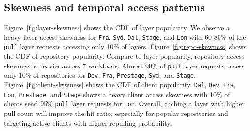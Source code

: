 %

\subsection{Skewness and temporal access patterns}



Figure~\ref{fig:layer-skewness} shows the CDF of layer popularity.
We observe a heavy layer access skewness for \texttt{Fra}, \texttt{Syd}, \texttt{Dal}, \texttt{Stage}, and \texttt{Lon} with 60-80\%  of the \texttt{pull} layer requests accessing only 10\% of layers.
Figure~\ref{fig:repo-skewness} shows the CDF of repository popularity.
Compare to layer popularity, 
repository access skewness is heavier across 7 workloads.
Almost 90\% of \texttt{pull} layer requests access only 10\% of repositories for 
\texttt{Dev}, \texttt{Fra}, \texttt{Prestage}, \texttt{Syd}, and \texttt{Stage}.
Figure~\ref{fig:client-skewness} shows the CDF of client popularity.
\texttt{Dal}, \texttt{Dev}, \texttt{Fra}, \texttt{Lon}, \texttt{Prestage}, and \texttt{Stage} shows a heavy client access skewness with
10\% of clients send 95\% \texttt{pull} layer requests for \texttt{Lon}.
Overall, caching a layer with higher pull count will improve the hit ratio, 
especially for popular repositories and targeting active clients with higher repulling probability.

